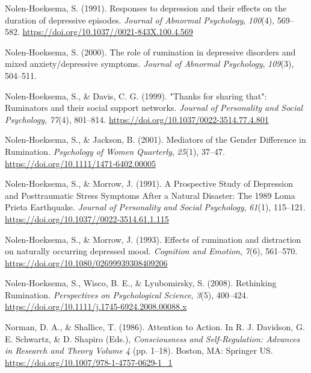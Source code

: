 \documentclass[a4paper,12pt,twoside,openright,oldfontcommands,final]{memoir}
\begin{document}
\leavevmode\hypertarget{ref-nolen-hoeksema_responses_1991}{}%
Nolen-Hoeksema, S. (1991). Responses to depression and their effects on the duration of depressive episodes. \emph{Journal of Abnormal Psychology}, \emph{100}(4), 569--582. \url{https://doi.org/10.1037//0021-843X.100.4.569}

\leavevmode\hypertarget{ref-Nolen-Hoeksema2000}{}%
Nolen-Hoeksema, S. (2000). The role of rumination in depressive disorders and mixed anxiety/depressive symptoms. \emph{Journal of Abnormal Psychology}, \emph{109}(3), 504--511.

\leavevmode\hypertarget{ref-nolen-hoeksema_thanks_1999}{}%
Nolen-Hoeksema, S., \& Davis, C. G. (1999). "Thanks for sharing that": Ruminators and their social support networks. \emph{Journal of Personality and Social Psychology}, \emph{77}(4), 801--814. \url{https://doi.org/10.1037/0022-3514.77.4.801}

\leavevmode\hypertarget{ref-nolen-hoeksema_mediators_2001}{}%
Nolen-Hoeksema, S., \& Jackson, B. (2001). Mediators of the Gender Difference in Rumination. \emph{Psychology of Women Quarterly}, \emph{25}(1), 37--47. \url{https://doi.org/10.1111/1471-6402.00005}

\leavevmode\hypertarget{ref-nolen-hoeksema_prospective_1991}{}%
Nolen-Hoeksema, S., \& Morrow, J. (1991). A Prospective Study of Depression and Posttraumatic Stress Symptoms After a Natural Disaster: The 1989 Loma Prieta Earthquake. \emph{Journal of Personality and Social Psychology}, \emph{61}(1), 115--121. \url{https://doi.org/10.1037//0022-3514.61.1.115}

\leavevmode\hypertarget{ref-nolen-hoeksema_effects_1993}{}%
Nolen-Hoeksema, S., \& Morrow, J. (1993). Effects of rumination and distraction on naturally occurring depressed mood. \emph{Cognition and Emotion}, \emph{7}(6), 561--570. \url{https://doi.org/10.1080/02699939308409206}

\leavevmode\hypertarget{ref-Nolen-Hoeksema2008}{}%
Nolen-Hoeksema, S., Wisco, B. E., \& Lyubomirsky, S. (2008). Rethinking Rumination. \emph{Perspectives on Psychological Science}, \emph{3}(5), 400--424. \url{https://doi.org/10.1111/j.1745-6924.2008.00088.x}

\leavevmode\hypertarget{ref-norman_attention_1986}{}%
Norman, D. A., \& Shallice, T. (1986). Attention to Action. In R. J. Davidson, G. E. Schwartz, \& D. Shapiro (Eds.), \emph{Consciousness and Self-Regulation: Advances in Research and Theory Volume 4} (pp. 1--18). Boston, MA: Springer US. \url{https://doi.org/10.1007/978-1-4757-0629-1_1}
\end{document}
